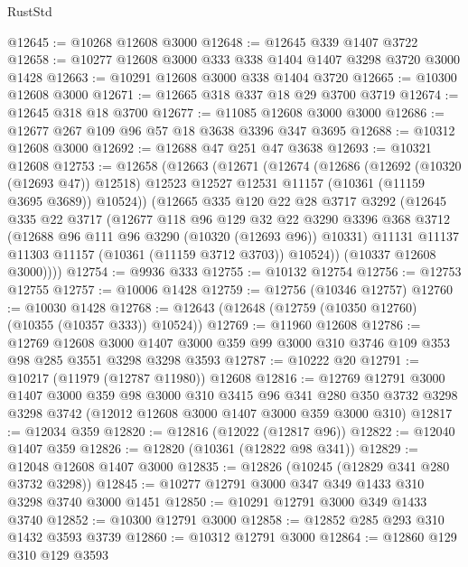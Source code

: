 \begin{lexlean}{RustStd}
\begin{coremodule}
@12645 := @10268 @12608 @3000
@12648 := @12645 @339 @1407 @3722
@12658 := @10277 @12608 @3000 @333 @338 @1404 @1407 @3298 @3720 @3000 @1428
@12663 := @10291 @12608 @3000 @338 @1404 @3720
@12665 := @10300 @12608 @3000
@12671 := @12665 @318 @337 @18 @29 @3700 @3719
@12674 := @12645 @318 @18 @3700
@12677 := @11085 @12608 @3000 @3000
@12686 := @12677 @267 @109 @96 @57 @18 @3638 @3396 @347 @3695
@12688 := @10312 @12608 @3000
@12692 := @12688 @47 @251 @47 @3638
@12693 := @10321 @12608
@12753 := @12658
    (@12663
      (@12671
        (@12674
          (@12686
            (@12692 (@10320 (@12693 @47)) @12518)
            @12523
            @12527
            @12531
            @11157
            (@10361 (@11159 @3695 @3689))
            @10524))
        (@12665
          @335
          @120
          @22
          @28
          @3717
          @3292
          (@12645
            @335
            @22
            @3717
            (@12677
              @118
              @96
              @129
              @32
              @22
              @3290
              @3396
              @368
              @3712
              (@12688 @96 @111 @96 @3290 (@10320 (@12693 @96)) @10331)
              @11131
              @11137
              @11303
              @11157
              (@10361 (@11159 @3712 @3703))
              @10524))
          (@10337 @12608 @3000))))
@12754 := @9936 @333
@12755 := @10132 @12754
@12756 := @12753 @12755
@12757 := @10006 @1428
@12759 := @12756 (@10346 @12757)
@12760 := @10030 @1428
@12768 := @12643 (@12648 (@12759 (@10350 @12760) (@10355 (@10357 @333)) @10524))
@12769 := @11960 @12608
@12786 := @12769
    @12608
    @3000
    @1407
    @3000
    @359
    @99
    @3000
    @310
    @3746
    @109
    @353
    @98
    @285
    @3551
    @3298
    @3298
    @3593
@12787 := @10222 @20
@12791 := @10217 (@11979 (@12787 @11980)) @12608
@12816 := @12769
    @12791
    @3000
    @1407
    @3000
    @359
    @98
    @3000
    @310
    @3415
    @96
    @341
    @280
    @350
    @3732
    @3298
    @3298
    @3742
    (@12012 @12608 @3000 @1407 @3000 @359 @3000 @310)
@12817 := @12034 @359
@12820 := @12816 (@12022 (@12817 @96))
@12822 := @12040 @1407 @359
@12826 := @12820 (@10361 (@12822 @98 @341))
@12829 := @12048 @12608 @1407 @3000
@12835 := @12826 (@10245 (@12829 @341 @280 @3732 @3298))
@12845 := @10277 @12791 @3000 @347 @349 @1433 @310 @3298 @3740 @3000 @1451
@12850 := @10291 @12791 @3000 @349 @1433 @3740
@12852 := @10300 @12791 @3000
@12858 := @12852 @285 @293 @310 @1432 @3593 @3739
@12860 := @10312 @12791 @3000
@12864 := @12860 @129 @310 @129 @3593

\end{coremodule}
\end{lexlean}
